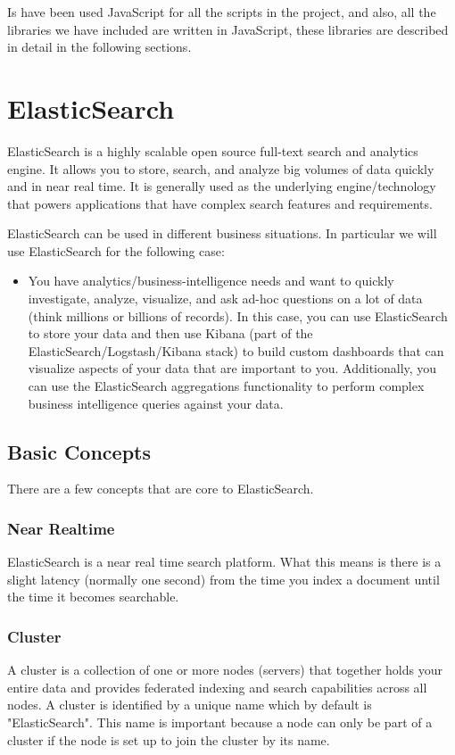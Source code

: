\documentclass[a4paper, 12pt]{book}
\begin{document}
Is have been used JavaScript for all the scripts in the project, and also, all the libraries we have included are written in JavaScript, these libraries are described in detail in the following sections.

\section{ElasticSearch}
\label{sec:ElasticSearch}
ElasticSearch is a highly scalable open source full-text search and analytics engine. It allows you to store, search, and analyze big volumes of data quickly and in near real time. It is generally used as the underlying engine/technology that powers applications that have complex search features and requirements.

ElasticSearch can be used in different business situations. In particular we will use ElasticSearch for the following case:

\begin{itemize}
\item You have analytics/business-intelligence needs and want to quickly investigate, analyze, visualize, and ask ad-hoc questions on a lot of data (think millions or billions of records). In this case, you can use ElasticSearch to store your data and then use Kibana (part of the ElasticSearch/Logstash/Kibana stack) to build custom dashboards that can visualize aspects of your data that are important to you. Additionally, you can use the ElasticSearch aggregations functionality to perform complex business intelligence queries against your data.
\end{itemize}

\subsection{Basic Concepts}
There are a few concepts that are core to ElasticSearch.

\subsubsection{Near Realtime}
ElasticSearch is a near real time search platform. What this means is there is a slight latency (normally one second) from the time you index a document until the time it becomes searchable.

\subsubsection{Cluster}
A cluster is a collection of one or more nodes (servers) that together holds your entire data and provides federated indexing and search capabilities across all nodes. A cluster is identified by a unique name which by default is "ElasticSearch". This name is important because a node can only be part of a cluster if the node is set up to join the cluster by its name.
\end{document}

